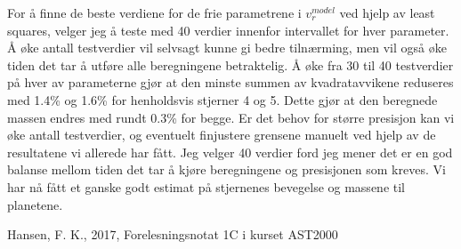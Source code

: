 \documentclass[english,notitlepage]{revtex4-1}  %
\begin{document}
For å finne de beste verdiene for de frie parametrene i $v_r^{model}$ ved hjelp av least
 squares, velger jeg å teste med 40 verdier innenfor intervallet for hver parameter. Å øke antall testverdier vil selvsagt kunne gi bedre tilnærming, men vil også øke tiden det tar å utføre alle beregningene betraktelig. Å øke fra 30 til 40 testverdier på hver av parameterne gjør at den minste summen av kvadratavvikene reduseres med 1.4\% og 1.6\% for henholdsvis stjerner 4 og 5. Dette gjør at den beregnede massen endres med rundt 0.3\% for begge. Er det behov for større presisjon kan vi øke antall testverdier, og eventuelt finjustere grensene manuelt ved hjelp av de resultatene vi allerede har fått. Jeg velger 40 verdier ford jeg mener det er en god balanse mellom tiden det tar å kjøre beregningene og presisjonen som kreves. Vi har nå fått et ganske godt estimat på stjernenes bevegelse og massene til planetene.

\begin{thebibliography}{}
 Hansen, F. K.,  2017, Forelesningsnotat 1C i kurset AST2000


\end{thebibliography}
\end{document}
